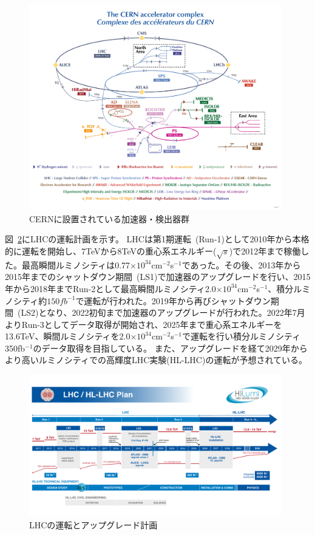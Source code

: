 \begin{figure}[h]
  \centering
  \includegraphics[clip, width=11cm]{fig/2/accel_complex-v2022_complex.png}
  \caption{CERNに設置されている加速器・検出器群\cite{article:accelerator-complex}}
  \label{fig:2-2}
\end{figure}


図~\ref{fig:2-3}にLHCの運転計画を示す。
LHCは第1期運転~(Run-1)として2010年から本格的に運転を開始し、7TeVから8TeVの重心系エネルギー($\sqrt{s}$)で2012年まで稼働した。最高瞬間ルミノシティは0.77$\times10^{34}$cm$^{-2}$s$^{-1}$であった。その後、2013年から2015年までのシャットダウン期間~(LS1)で加速器のアップグレードを行い、2015年から2018年までRun-2として最高瞬間ルミノシティ2.0$\times10^{34}$cm$^{-2}$s$^{-1}$、積分ルミノシティ約$150fb^{-1}$で運転が行われた。2019年から再びシャットダウン期間~(LS2)となり、2022初旬まで加速器のアップグレードが行われた。2022年7月よりRun-3としてデータ取得が開始され、2025年まで重心系エネルギーを13.6TeV、瞬間ルミノシティを2.0$\times10^{34}$cm$^{-2}$s$^{-1}$で運転を行い積分ルミノシティ350fb$^{-1}$のデータ取得を目指している。
また、アップグレードを経て2029年からより高いルミノシティでの高輝度LHC実験(HL-LHC)の運転が予想されている。

\begin{figure}[h]
  \centering
  \includegraphics[clip, width=11cm]{fig/2/HL-LHC_Janvier2022.pdf}
  \caption{LHCの運転とアップグレード計画\cite{article:LHCDesignReport}}
  \label{fig:2-3}
\end{figure}



